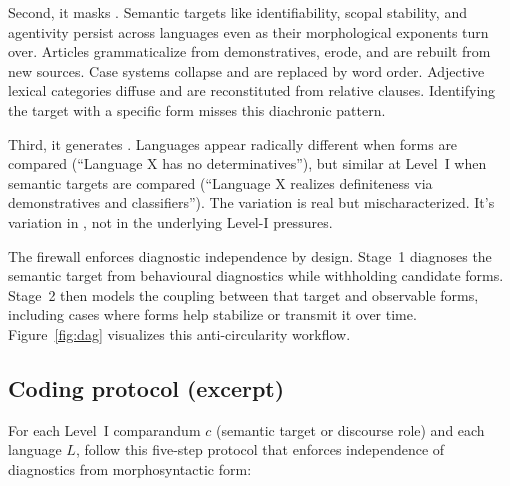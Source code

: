 \documentclass[12pt]{article}
\begin{document}
Second, it masks . Semantic targets like identifiability, scopal stability, and agentivity persist across languages even as their morphological exponents turn over. Articles grammaticalize from demonstratives, erode, and are rebuilt from new sources. Case systems collapse and are replaced by word order. Adjective lexical categories diffuse and are reconstituted from relative clauses. Identifying the target with a specific form misses this diachronic pattern.

Third, it generates . Languages appear radically different when forms are compared (\enquote{Language X has no determinatives}), but similar at Level~I when semantic targets are compared (\enquote{Language X realizes definiteness via demonstratives and classifiers}). The variation is real but mischaracterized. It's variation in , not in the underlying Level-I pressures.

The firewall enforces diagnostic independence by design. Stage~1 diagnoses the semantic target from behavioural diagnostics while withholding candidate forms. Stage~2 then models the coupling between that target and observable forms, including cases where forms help stabilize or transmit it over time. Figure~\ref{fig:dag} visualizes this anti-circularity workflow.

\subsection{Coding protocol (excerpt)}\label{subsec:firewall-protocol}

For each Level~I comparandum $c$ (semantic target or discourse role) and each language $L$, follow this five-step protocol that enforces independence of diagnostics from morphosyntactic form:
\end{document}
